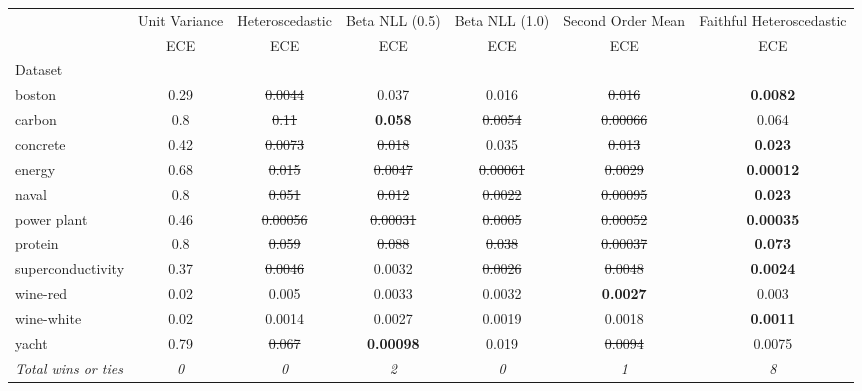 \begin{tabular}{l|c|c|c|c|c|c}
\toprule
{} & {Unit Variance} & {Heteroscedastic} & {Beta NLL (0.5)} & {Beta NLL (1.0)} & {Second Order Mean} & {Faithful Heteroscedastic} \\
{} & {ECE} & {ECE} & {ECE} & {ECE} & {ECE} & {ECE} \\
{Dataset} & {} & {} & {} & {} & {} & {} \\
\midrule
boston & 0.29 & \sout{0.0044} & 0.037 & 0.016 & \sout{0.016} & \textbf{0.0082} \\
carbon & 0.8 & \sout{0.11} & \textbf{0.058} & \sout{0.0054} & \sout{0.00066} & 0.064 \\
concrete & 0.42 & \sout{0.0073} & \sout{0.018} & 0.035 & \sout{0.013} & \textbf{0.023} \\
energy & 0.68 & \sout{0.015} & \sout{0.0047} & \sout{0.00061} & \sout{0.0029} & \textbf{0.00012} \\
naval & 0.8 & \sout{0.051} & \sout{0.012} & \sout{0.0022} & \sout{0.00095} & \textbf{0.023} \\
power plant & 0.46 & \sout{0.00056} & \sout{0.00031} & \sout{0.0005} & \sout{0.00052} & \textbf{0.00035} \\
protein & 0.8 & \sout{0.059} & \sout{0.088} & \sout{0.038} & \sout{0.00037} & \textbf{0.073} \\
superconductivity & 0.37 & \sout{0.0046} & 0.0032 & \sout{0.0026} & \sout{0.0048} & \textbf{0.0024} \\
wine-red & 0.02 & 0.005 & 0.0033 & 0.0032 & \textbf{0.0027} & 0.003 \\
wine-white & 0.02 & 0.0014 & 0.0027 & 0.0019 & 0.0018 & \textbf{0.0011} \\
yacht & 0.79 & \sout{0.067} & \textbf{0.00098} & 0.019 & \sout{0.0094} & 0.0075 \\
\textit{{Total wins or ties}} & \textit{0} & \textit{0} & \textit{2} & \textit{0} & \textit{1} & \textit{8} \\
\bottomrule
\end{tabular}
